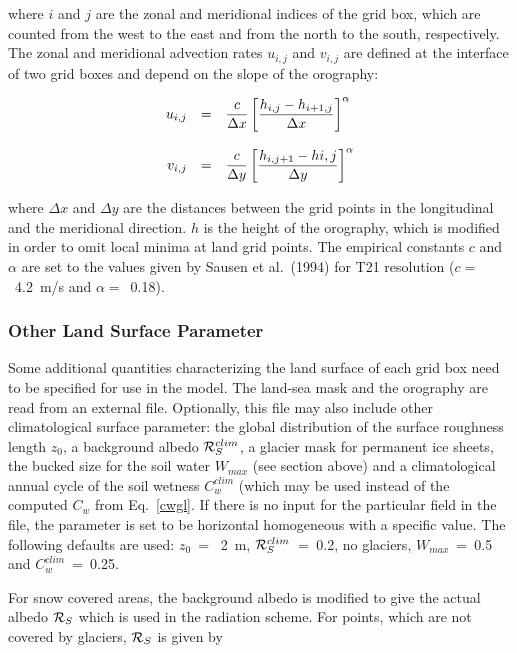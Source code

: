 where $i$ and $j$ are the zonal and meridional indices
of the grid box, which are counted
from the west to the east and from the north to the
south, respectively. The zonal and
meridional advection rates $u_{i,j}$ and $v_{i,j}$ are
defined at the interface of two grid
boxes and depend on the slope of the orography:

\begin{equation}
\begin{array}{rcl}
\displaystyle u_{i,j} & = & \displaystyle \frac{c}{\Delta
x}\left[\frac{h_{i,j}-h_{i+1,j}}{\Delta
x}\right]^{\alpha} \\
&& \\
\displaystyle v_{i,j} & = & \displaystyle \frac{c}{\Delta
y}\left[\frac{h_{i,j+1}-h{i,j}}{\Delta
y}\right]^{\alpha}
\end{array}
\end{equation}

where $\Delta x$ and $\Delta y$ are the distances
between the grid points in the longitudinal
and the meridional direction. $h$ is the height of the
orography, which is modified in
order to omit local minima at land grid points. The
empirical constants $c$ and $\alpha$ are
set to the values given by Sausen et al.~(1994) for T21
resolution ($c = $~4.2~m/s and
$\alpha =$~0.18).  

\subsubsection{Other Land Surface
Parameter}\label{landsurf}

Some additional quantities characterizing the land surface of
each grid box need to be specified for use in the model. The land-sea mask and the orography
are read from an external file. Optionally, this file may also include other climatological surface
parameter: the global distribution of the surface roughness length $z_0$, a background albedo
${\cal R}_S^{clim}$, a glacier mask for permanent ice sheets, the bucked size for the soil water
$W_{max}$ (see section above) and a climatological annual cycle of the soil wetness
$C^{clim}_w$ (which may be used instead of the computed $C_w$ from Eq.~\ref{cwgl}. If
there is no input for the particular field in the file, the parameter is set to be horizontal
homogeneous with a specific value. The following defaults are used: $z_0$~=~ 2~m,
 ${\cal R}_S^{clim}$~=~0.2, no glaciers, $W_{max}$~=~0.5 and $C^{clim}_w$~=~0.25. 

For snow covered areas, the background albedo is modified to give the actual albedo ${\cal
R}_S$
which is used in the radiation scheme. For points, which are not covered by glaciers, ${\cal
R}_S$ is
given by

